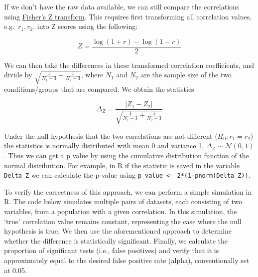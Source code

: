 \documentclass[
]{book}
\begin{document}
If we don't have the raw data available, we can still compare the correlations using \href{https://en.wikipedia.org/wiki/Fisher_transformation}{Fisher's Z transform}. This requires first transforming all correlation values, e.g.~\(r_1, r_2\), into Z scores using the following:

\[
Z=\frac{\log(1+r)−\log(1−r)}{2}
\]

We can then take the differences in these transformed correlation coefficients, and divide by \(\sqrt{\frac{1}{N_1 - 3} + \frac{1}{N_2 - 3}}\), where \(N_1\) and \(N_2\) are the sample size of the two conditions/groups that are compared. We obtain the statistics

\[
\Delta_Z = \frac{|Z_1 - Z_2|}{\sqrt{\frac{1}{N_1 - 3} + \frac{1}{N_2 - 3}}}
\]

Under the null hypothesis that the two correlations are not different (\(H_0: r_1 =r_2\)) the statistics is normally distributed with mean 0 and variance 1, \(\Delta_Z \sim \mathcal{N}(0,1)\). Thus we can get a p value by using the cumulative distribution function of the normal distribution. For example, in R if the statistic is saved in the variable \texttt{Delta\_Z} we can calculate the p-value using \texttt{p\_value\ \textless{}-\ 2*(1-pnorm(Delta\_Z))}.

To verify the correctness of this approach, we can perform a simple simulation in R. The code below simulates multiple pairs of datasets, each consisting of two variables, from a population with a given correlation. In this simulation, the `true' correlation value remains constant, representing the case where the null hypothesis is true. We then use the aforementioned approach to determine whether the difference is statistically significant. Finally, we calculate the proportion of significant tests (i.e., false positives) and verify that it is approximately equal to the desired false positive rate (alpha), conventionally set at 0.05.
\end{document}

